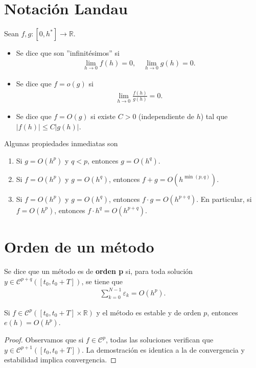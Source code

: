 \section{Notación Landau}

Sean $f,g : [0,h^*] \longrightarrow \mathbb{R}$.
\begin{itemize}
    \item Se dice que son ''infinitésimos'' si
          \begin{align*}
              \lim_{h \to 0} f(h) = 0, \quad\lim_{h \to 0} g(h) = 0.
          \end{align*}
    \item Se dice que $f = o(g)$ si
          \begin{align*}
              \lim_{h \to 0} \frac{f(h)}{g(h)} = 0.
          \end{align*}
    \item Se dice que $f = O(g)$ si existe $C > 0$ (independiente de $h$) tal que $|f(h)| \leq C|g(h)|$.
\end{itemize}
Algunas propiedades inmediatas son
\begin{enumerate}
    \item Si $g = O(h^p)$ y $q < p$, entonces $g = O(h^q)$.
    \item Si $f = O(h^p)$ y $g = O(h^q)$, entonces $f + g = O(h^{\min(p,q)})$.
    \item Si $f = O(h^p)$ y $g = O(h^q)$, entonces $f \cdot g = O(h^{p+q})$. En particular, si $f = O(h^p)$, entonces $f \cdot h^q = O(h^{p+q})$.
\end{enumerate}

\section{Orden de un método}

\begin{defi}
    Se dice que un método es de \textbf{orden p} si, para toda solución $y \in \mathcal{C}^{p+q}([t_0,t_0+T])$, se tiene que
    \begin{align*}
        \sum_{k=0}^{N-1} \varepsilon_k = O(h^p).
    \end{align*}
\end{defi}

\begin{teo}
    Si $f \in \mathcal{C}^p([t_0,t_0+T] \times \mathbb{R})$ y el método es estable y de orden $p$, entonces $e(h) = O(h^p)$.
\end{teo}

\begin{proof}
    Observamos que si $f \in \mathcal{C}^p$, todas las soluciones verifican que $y \in \mathcal{C}^{p+1}([t_0,t_0+T])$. La demostración es identica a la de convergencia y estabilidad implica convergencia.
\end{proof}

